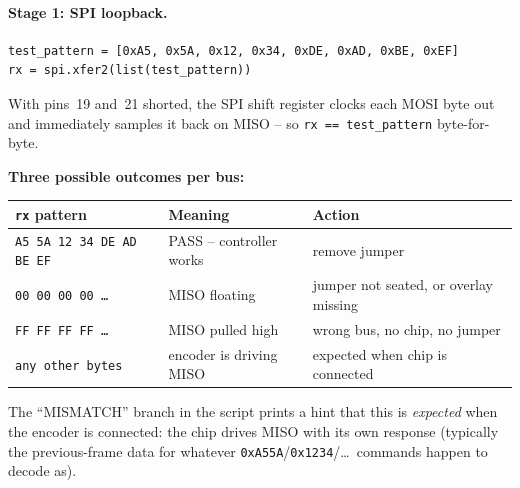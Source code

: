 \documentclass[11pt,a4paper]{article}
\begin{document}
\paragraph{Stage 1: SPI loopback.}
\begin{lstlisting}
test_pattern = [0xA5, 0x5A, 0x12, 0x34, 0xDE, 0xAD, 0xBE, 0xEF]
rx = spi.xfer2(list(test_pattern))
\end{lstlisting}
With pins~19 and~21 shorted, the SPI shift register clocks each MOSI
byte out and immediately samples it back on MISO -- so
\texttt{rx == test\_pattern} byte-for-byte.

\textbf{Three possible outcomes per bus:}
\begin{center}\small
\begin{tabular}{lll}
\toprule
\texttt{rx} pattern & Meaning & Action \\
\midrule
\texttt{A5 5A 12 34 DE AD BE EF} & PASS  -- controller works  & remove jumper \\
\texttt{00 00 00 00 \ldots}      & MISO floating              & jumper not seated, or overlay missing \\
\texttt{FF FF FF FF \ldots}      & MISO pulled high           & wrong bus, no chip, no jumper \\
\texttt{any other bytes}         & encoder is driving MISO    & expected when chip is connected \\
\bottomrule
\end{tabular}
\end{center}
The ``MISMATCH'' branch in the script prints a hint that this is
\emph{expected} when the encoder is connected: the chip drives MISO
with its own response (typically the previous-frame data for whatever
\texttt{0xA55A}/\texttt{0x1234}/\ldots\ commands happen to decode as).
\end{document}
